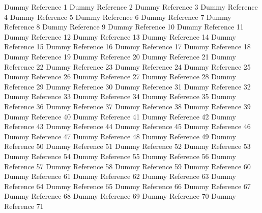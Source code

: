 \documentclass{article}
\begin{document}
\begin{thebibliography}{99}
     Dummy Reference 1
     Dummy Reference 2
     Dummy Reference 3
     Dummy Reference 4
     Dummy Reference 5
     Dummy Reference 6
     Dummy Reference 7
     Dummy Reference 8
     Dummy Reference 9
     Dummy Reference 10
     Dummy Reference 11
     Dummy Reference 12
     Dummy Reference 13
     Dummy Reference 14
     Dummy Reference 15
     Dummy Reference 16
     Dummy Reference 17
     Dummy Reference 18
     Dummy Reference 19
     Dummy Reference 20
     Dummy Reference 21
     Dummy Reference 22
     Dummy Reference 23
     Dummy Reference 24
     Dummy Reference 25
     Dummy Reference 26
     Dummy Reference 27
     Dummy Reference 28
     Dummy Reference 29
     Dummy Reference 30
     Dummy Reference 31
     Dummy Reference 32
     Dummy Reference 33
     Dummy Reference 34
     Dummy Reference 35
     Dummy Reference 36
     Dummy Reference 37
     Dummy Reference 38
     Dummy Reference 39
     Dummy Reference 40
     Dummy Reference 41
     Dummy Reference 42
     Dummy Reference 43
     Dummy Reference 44
     Dummy Reference 45
     Dummy Reference 46
     Dummy Reference 47
     Dummy Reference 48
     Dummy Reference 49
     Dummy Reference 50
     Dummy Reference 51
     Dummy Reference 52
     Dummy Reference 53
     Dummy Reference 54
     Dummy Reference 55
     Dummy Reference 56
     Dummy Reference 57
     Dummy Reference 58
     Dummy Reference 59
     Dummy Reference 60
     Dummy Reference 61
     Dummy Reference 62
     Dummy Reference 63
     Dummy Reference 64
     Dummy Reference 65
     Dummy Reference 66
     Dummy Reference 67
     Dummy Reference 68
     Dummy Reference 69
     Dummy Reference 70
     Dummy Reference 71

\end{thebibliography}
\end{document}
